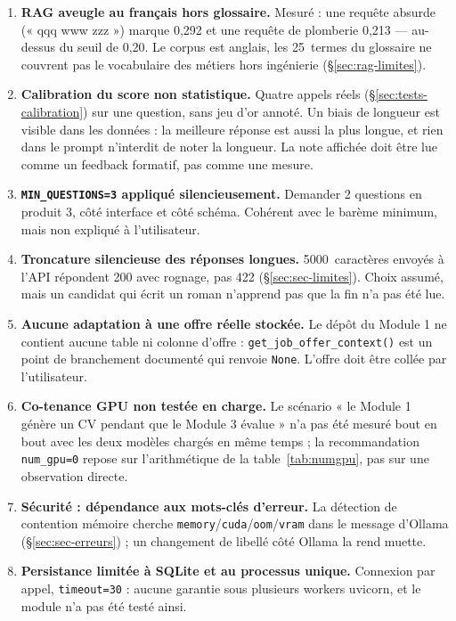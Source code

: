 \begin{enumerate}[label=\textbf{L\arabic*.},leftmargin=3.2em,itemsep=4pt]
        Questions, évaluation et amélioration sont trois conversations
        indépendantes. Impossible donc de demander « reformule ta question 2 en
        plus court » ou de faire une séance de suivi cohérente ; chaque prompt
        doit ré-expliquer le contexte, ce qui est aussi ce qui les rend longs.
  \item \textbf{RAG aveugle au français hors glossaire.} Mesuré : une requête
        absurde (« qqq www zzz ») marque 0,292 et une requête de plomberie
        0,213 --- au-dessus du seuil de 0,20. Le corpus est anglais, les
        25~termes du glossaire ne couvrent pas le vocabulaire des métiers hors
        ingénierie (§\ref{sec:rag-limites}).
  \item \textbf{Calibration du score non statistique.} Quatre appels réels
        (§\ref{sec:tests-calibration}) sur une question, sans jeu d'or annoté.
        Un biais de longueur est visible dans les données : la meilleure réponse
        est aussi la plus longue, et rien dans le prompt n'interdit de noter la
        longueur. La note affichée doit être lue comme un feedback formatif,
        pas comme une mesure.
  \item \textbf{\texttt{MIN\_QUESTIONS=3} appliqué silencieusement.} Demander 2
        questions en produit 3, côté interface et côté schéma. Cohérent avec le
        barème minimum, mais non expliqué à l'utilisateur.
  \item \textbf{Troncature silencieuse des réponses longues.} 5000~caractères
        envoyés à l'API répondent 200 avec rognage, pas 422
        (§\ref{sec:sec-limites}). Choix assumé, mais un candidat qui écrit un
        roman n'apprend pas que la fin n'a pas été lue.
  \item \textbf{Aucune adaptation à une offre réelle stockée.} Le dépôt du
        Module 1 ne contient aucune table ni colonne d'offre :
        \texttt{get\_job\_offer\_context()} est un point de branchement documenté
        qui renvoie \texttt{None}. L'offre doit être collée par l'utilisateur.
  \item \textbf{Co-tenance GPU non testée en charge.} Le scénario « le Module 1
        génère un CV pendant que le Module 3 évalue » n'a pas été mesuré
        bout en bout avec les deux modèles chargés en même temps ; la
        recommandation \texttt{num\_gpu=0} repose sur l'arithmétique de la
        table~\ref{tab:numgpu}, pas sur une observation directe.
  \item \textbf{Sécurité : dépendance aux mots-clés d'erreur.} La détection de
        contention mémoire cherche \texttt{memory}/\texttt{cuda}/\texttt{oom}/\texttt{vram}
        dans le message d'Ollama (§\ref{sec:sec-erreurs}) ; un changement de
        libellé côté Ollama la rend muette.
  \item \textbf{Persistance limitée à SQLite et au processus unique.} Connexion
        par appel, \texttt{timeout=30} : aucune garantie sous plusieurs workers
        uvicorn, et le module n'a pas été testé ainsi.
\end{enumerate}

